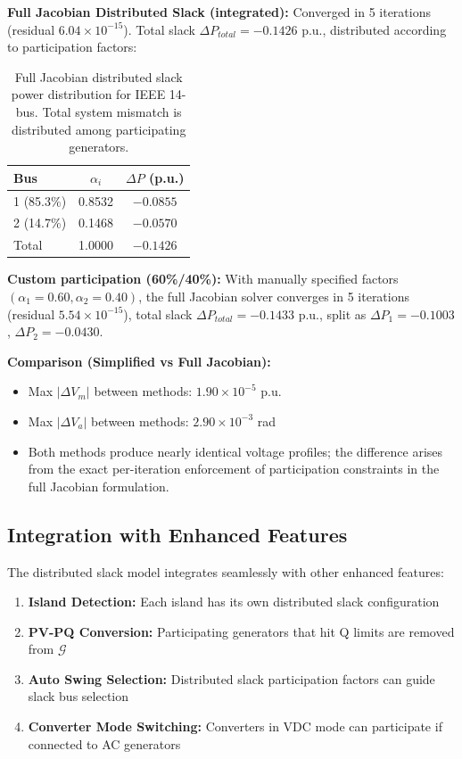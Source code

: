 \documentclass[11pt]{article}
\begin{document}
\textbf{Full Jacobian Distributed Slack (integrated):}
Converged in 5 iterations (residual $6.04 \times 10^{-15}$). Total slack $\Delta P_{total} = -0.1426$ p.u.,
distributed according to participation factors:

\begin{table}[h]
\centering
\begin{tabular}{l|c|c}
\hline
Bus & $\alpha_i$ & $\Delta P$ (p.u.) \\
\hline
1 (85.3\%) & 0.8532 & $-0.0855$ \\
2 (14.7\%) & 0.1468 & $-0.0570$ \\
\hline
Total & 1.0000 & $-0.1426$ \\
\hline
\end{tabular}
\caption{Full Jacobian distributed slack power distribution for IEEE 14-bus. Total system mismatch is distributed among participating generators.}
\end{table}

\textbf{Custom participation (60\%/40\%):}
With manually specified factors $(\alpha_1=0.60, \alpha_2=0.40)$, the full Jacobian solver converges in 5 iterations (residual $5.54 \times 10^{-15}$), total slack $\Delta P_{total} = -0.1433$ p.u., split as $\Delta P_1 = -0.1003$, $\Delta P_2 = -0.0430$.

\textbf{Comparison (Simplified vs Full Jacobian):}
\begin{itemize}
    \item Max $|\Delta V_m|$ between methods: $1.90 \times 10^{-5}$ p.u.
    \item Max $|\Delta V_a|$ between methods: $2.90 \times 10^{-3}$ rad
    \item Both methods produce nearly identical voltage profiles; the difference arises from the exact per-iteration enforcement of participation constraints in the full Jacobian formulation.
\end{itemize}

\subsection{Integration with Enhanced Features}

The distributed slack model integrates seamlessly with other enhanced features:

\begin{enumerate}
    \item \textbf{Island Detection:} Each island has its own distributed slack configuration
    \item \textbf{PV-PQ Conversion:} Participating generators that hit Q limits are removed from $\mathcal{G}$
    \item \textbf{Auto Swing Selection:} Distributed slack participation factors can guide slack bus selection
    \item \textbf{Converter Mode Switching:} Converters in VDC mode can participate if connected to AC generators
\end{enumerate}
\end{document}
